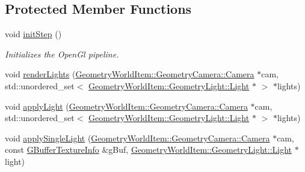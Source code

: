\subsection*{Protected Member Functions}
\begin{DoxyCompactItemize}
\item 
\mbox{\label{class_geometry_engine_1_1_geometry_render_step_1_1_lighting_pass_aaab2ea74a9710f22887c266af1985490}} 
void \mbox{\hyperlink{class_geometry_engine_1_1_geometry_render_step_1_1_lighting_pass_aaab2ea74a9710f22887c266af1985490}{init\+Step}} ()
\begin{DoxyCompactList}\small\item\em Initializes the Open\+Gl pipeline. \end{DoxyCompactList}\item 
void \mbox{\hyperlink{class_geometry_engine_1_1_geometry_render_step_1_1_lighting_pass_a437ff10a7ef9e7529a4852389a5cf871}{render\+Lights}} (\mbox{\hyperlink{class_geometry_engine_1_1_geometry_world_item_1_1_geometry_camera_1_1_camera}{Geometry\+World\+Item\+::\+Geometry\+Camera\+::\+Camera}} $\ast$cam, std\+::unordered\+\_\+set$<$ \mbox{\hyperlink{class_geometry_engine_1_1_geometry_world_item_1_1_geometry_light_1_1_light}{Geometry\+World\+Item\+::\+Geometry\+Light\+::\+Light}} $\ast$ $>$ $\ast$lights)
\item 
void \mbox{\hyperlink{class_geometry_engine_1_1_geometry_render_step_1_1_lighting_pass_a9d0a0f3b9d52036b9d4f9fbee353cd10}{apply\+Light}} (\mbox{\hyperlink{class_geometry_engine_1_1_geometry_world_item_1_1_geometry_camera_1_1_camera}{Geometry\+World\+Item\+::\+Geometry\+Camera\+::\+Camera}} $\ast$cam, std\+::unordered\+\_\+set$<$ \mbox{\hyperlink{class_geometry_engine_1_1_geometry_world_item_1_1_geometry_light_1_1_light}{Geometry\+World\+Item\+::\+Geometry\+Light\+::\+Light}} $\ast$ $>$ $\ast$lights)
\item 
void \mbox{\hyperlink{class_geometry_engine_1_1_geometry_render_step_1_1_lighting_pass_ae55cc29215ac54a526d9107f4e1f2803}{apply\+Single\+Light}} (\mbox{\hyperlink{class_geometry_engine_1_1_geometry_world_item_1_1_geometry_camera_1_1_camera}{Geometry\+World\+Item\+::\+Geometry\+Camera\+::\+Camera}} $\ast$cam, const \mbox{\hyperlink{struct_geometry_engine_1_1_g_buffer_texture_info}{G\+Buffer\+Texture\+Info}} \&g\+Buf, \mbox{\hyperlink{class_geometry_engine_1_1_geometry_world_item_1_1_geometry_light_1_1_light}{Geometry\+World\+Item\+::\+Geometry\+Light\+::\+Light}} $\ast$light)

\end{DoxyCompactItemize}
